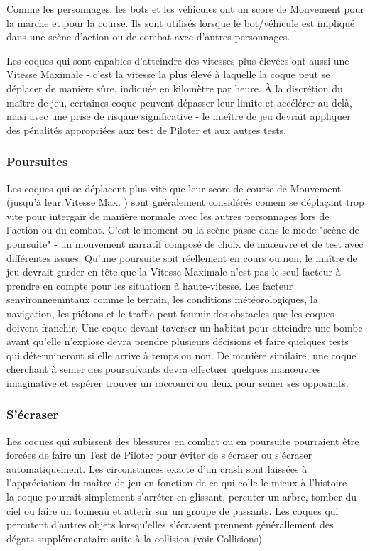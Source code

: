 Comme les personnages, les bots et les véhicules ont un score de Mouvement pour la marche et pour la course. Ils sont utilisés lorsque le bot/véhicule est impliqué dans une scène d'action ou de combat avec d'autres personnages. 

Les coques qui sont capables d'atteindre des vitesses plus élevées ont aussi une Vitesse Maximale - c'est la vitesse la plus élevé à laquelle la coque peut se déplacer de manière sûre, indiquée en kilomètre par heure. À la discrétion du maître de jeu, certaines coque peuvent dépasser leur limite et accélérer au-delà, masi avec une prise de risqaue significative - le mæître de jeu devrait appliquer des pénalités appropriées aux test de Piloter et aux autres tests. 

\subsubsection{Poursuites} 

Les coques qui se déplacent plus vite que leur score de course de Mouvement (jusqu'à leur Vitesse Max. ) sont gnéralement considérés comem se déplaçant trop vite pour intergair de manière normale avec les autres personnages lors de l'action ou du combat. C'est le moment ou la scène passe dans le mode "scène de poursuite" - un mouvement narratif composé de choix de maœuvre et de test avec différentes issues. Qu'une poursuite soit réellement en cours ou non, le maître de jeu devrait garder en tête que la Vitesse Maximale n'est pas le seul facteur à prendre en compte pour les situatiosn à haute-vitesse. Les facteur senvironneemntaux comme le terrain, les conditions météorologiques, la navigation, les piétons et le traffic peut fournir des obstacles que les coques doivent franchir. Une coque devant taverser un habitat pour atteindre une bombe avant qu'elle n'explose devra prendre plusieurs décisions et faire quelques tests qui détermineront si elle arrive à temps ou non. De manière similaire, une coque cherchant à semer des poursuivants devra effectuer quelques manœuvres imaginative et espérer trouver un raccourci ou deux pour semer ses opposants. 

\subsubsection{S'écraser} 

Les coques qui subissent des blessures en combat ou en poursuite pourraient être forcées de faire un Test de Piloter pour éviter de s'écraser ou s'écraser automatiquement. Les circonstances exacte d'un crash sont laissées à l'appréciation du maître de jeu en fonction de ce qui colle le mieux à l'histoire - la coque pourrait simplement s'arréter en glissant, percuter un arbre, tomber du ciel ou faire un tonneau et atterir sur un groupe de passants. Les coques qui percutent d'autres objets lorsqu'elles s'écrasent prennent générallement des dégats supplémenataire suite à la collision (voir Collisions) 

